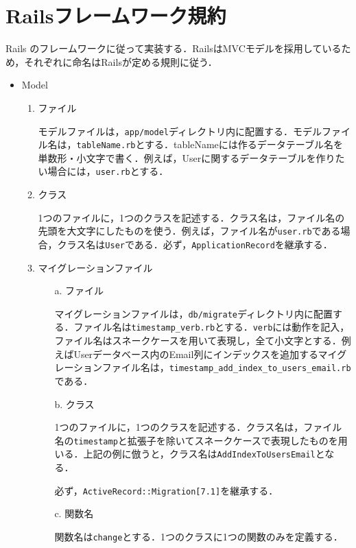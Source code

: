 \newpage

\section{Railsフレームワーク規約}\label{q3.2}
Rails のフレームワークに従って実装する．RailsはMVCモデルを採用しているため，それぞれに命名はRailsが定める規則に従う．
\begin{itemize}
    \item Model
    \begin{enumerate}
        \item ファイル
        
        モデルファイルは，\texttt{app/model}ディレクトリ内に配置する．モデルファイル名は，\texttt{tableName.rb}とする．tableNameには作るデータテーブル名を単数形・小文字で書く．例えば，Userに関するデータテーブルを作りたい場合には，\texttt{user.rb}とする．
        
        \item クラス

        1つのファイルに，1つのクラスを記述する．クラス名は，ファイル名の先頭を大文字にしたものを使う．例えば，ファイル名が\texttt{user.rb}である場合，クラス名は\texttt{User}である．必ず，\texttt{ApplicationRecord}を継承する．
        
        \item マイグレーションファイル
        \begin{enumerate}
            \item[a.] ファイル
            
            マイグレーションファイルは，\texttt{db/migrate}ディレクトリ内に配置する．ファイル名は\texttt{timestamp\_verb.rb}とする．\texttt{verb}には動作を記入，ファイル名はスネークケースを用いて表現し，全て小文字とする．例えばUserデータベース内のEmail列にインデックスを追加するマイグレーションファイル名は，\texttt{timestamp\_add\_index\_to\_users\_email.rb}である．
            \item[b.] クラス

            1つのファイルに，1つのクラスを記述する．クラス名は，ファイル名の\texttt{timestamp}と拡張子を除いてスネークケースで表現したものを用いる．上記の例に倣うと，クラス名は\texttt{AddIndexToUsersEmail}となる．
            
            必ず，\texttt{ActiveRecord::Migration[7.1]}を継承する．

            \item[c.] 関数名

            関数名は\texttt{change}とする．1つのクラスに1つの関数のみを定義する．
        \end{enumerate}
    \end{enumerate}
    

\end{itemize}

